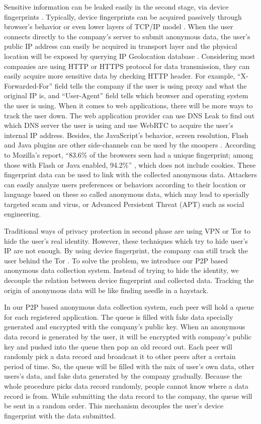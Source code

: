 \documentclass[twocolumn]{article}
\begin{document}
Sensitive information can be leaked easily in the second stage, via device fingerprints \cite{yen2012host}. Typically, device fingerprints can be acquired passively through browser's behavior or even lower layers of TCP/IP model \cite{nikiforakis2013cookieless} \cite{neumann2012empirical}. When the user connects directly to the company's server to submit anonymous data, the user's public IP address can easily be acquired in transport layer and the physical location will be exposed by querying IP Geolocation database \cite{katz2006towards}. Considering most companies are using HTTP or HTTPS protocol for data transmission, they can easily acquire more sensitive data by checking HTTP header. For example, ``X-Forwarded-For'' field tells the company if the user is using proxy and what the original IP is, and ``User-Agent'' field tells which browser and operating system the user is using. When it comes to web applications, there will be more ways to track the user down. The web application provider can use DNS Leak to find out which DNS server the user is using and use WebRTC to acquire the user's internal IP address. Besides, the JavaScript's behavior, screen resolution, Flash and Java plugins are other side-channels can be used by the snoopers \cite{mozilla}. According to Mozilla's report, ``83.6\% of the browsers seen had a unique fingerprint; among those with Flash or Java enabled, 94.2\%'' \cite{mozilla}, which does not include cookies. These fingerprint data can be used to link with the collected anonymous data. Attackers can easily analyze users preferences or behaviors according to their location or language based on these so called anonymous data, which may lead to specially targeted scam and virus, or Advanced Persistent Threat (APT) \cite{daly2009advanced} such as social engineering.

Traditional ways of privacy protection in second phase are using VPN or Tor to hide the user's real identity. However, these techniques which try to hide user's IP are not enough. By using device fingerprint, the company can still track the user behind the Tor \cite{wang2013improved}. To solve the problem, we introduce our P2P based anonymous data collection system. Instead of trying to hide the identity, we decouple the relation between device fingerprint and collected data. Tracking the origin of anonymous data will be like finding needle in a haystack.

In our P2P based anonymous data collection system, each peer will hold a queue for each registered application. The queue is filled with fake data specially generated and encrypted with the company’s public key. When an anonymous data record is generated by the user, it will be encrypted with company’s public key and pushed into the queue then pop an old record out. Each peer will randomly pick a data record and broadcast it to other peers after a certain period of time. So, the queue will be filled with the mix of user’s own data, other users’s data, and fake data generated by the company gradually. Because the whole procedure picks data record randomly, people cannot know where a data record is from. While submitting the data record to the company, the queue will be sent in a random order. This mechanism decouples the user’s device fingerprint with  the data submitted.
\end{document}
